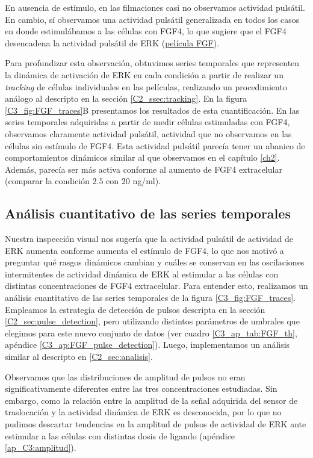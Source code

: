 \documentclass[./main.tex]{subfiles}
\begin{document}
En ausencia de estímulo, en las filmaciones casi no observamos actividad pulsátil. En cambio, sí observamos una actividad pulsátil generalizada en todos los casos en donde estimulábamos a las células con FGF4, lo que sugiere que el FGF4 desencadena la actividad pulsátil de ERK (\href{http://movie.biologists.com/video/10.1242/dev.199710/video-2}{película FGF}). 

Para profundizar esta observación, obtuvimos series temporales que representen la dinámica de activación de ERK en cada condición a partir de realizar un \textit{tracking} de células individuales en las películas, realizando un procedimiento análogo al descripto en la sección \ref{C2_ssec:tracking}. En la figura \ref{C3_fig:FGF_traces}B presentamos los resultados de esta cuantificación. En las series temporales adquiridas a partir de medir células estimuladas con FGF4, observamos claramente actividad pulsátil, actividad que no observamos en las células sin estímulo de FGF4. Esta actividad pulsátil parecía tener un abanico de comportamientos dinámicos similar al que observamos en el capítulo \ref{ch2}. Además, parecía ser más activa conforme al aumento de FGF4 extracelular (comparar la condición $2.5$ con $20$ ng/ml). 


\subsection{Análisis cuantitativo de las series temporales}
\label{C3_ssec:analisis_cuantitativo}

Nuestra inspección visual nos sugería que la actividad pulsátil de actividad de ERK aumenta conforme aumenta el estímulo de FGF4, lo que nos motivó a preguntar qué rasgos dinámicos cambian y cuáles se conservan en las oscilaciones intermitentes de actividad dinámica de ERK al estimular a las células con distintas concentraciones de FGF4 extracelular. Para entender esto, realizamos un análisis cuantitativo de las series temporales de la figura \ref{C3_fig:FGF_traces}. Empleamos la estrategia de detección de pulsos descripta en la sección \ref{C2_sec:pulse_detection}, pero utilizando distintos parámetros de umbrales que elegimos para este nuevo conjunto de datos (ver cuadro \ref{C3_ap_tab:FGF_th}, apéndice \ref{C3_ap:FGF_pulse_detection}). Luego, implementamos un análisis similar al descripto en \ref{C2_sec:analisis}. 

Observamos que las distribuciones de amplitud de pulsos no eran significativamente diferentes entre las tres concentraciones estudiadas. Sin embargo, como la relación entre la amplitud de la señal adquirida del sensor de traslocación y la actividad dinámica de ERK es desconocida, por lo que no pudimos descartar tendencias en la amplitud de pulsos de actividad de ERK ante estimular a las células con  distintas dosis de ligando (apéndice \ref{ap_C3:amplitud}). 
\end{document}

